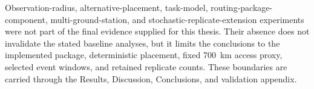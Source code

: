 Observation-radius, alternative-placement, task-model, routing-package-component, multi-ground-station, and stochastic-replicate-extension experiments were not part of the final evidence supplied for this thesis. Their absence does not invalidate the stated baseline analyses, but it limits the conclusions to the implemented package, deterministic placement, fixed \SI{700}{\kilo\metre} access proxy, selected event windows, and retained replicate counts. These boundaries are carried through the Results, Discussion, Conclusions, and validation appendix.
